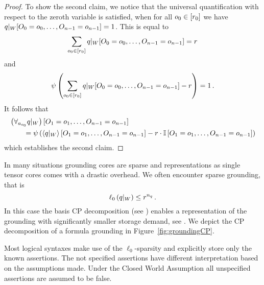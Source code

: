 \begin{proof}
	To show the second claim, we notice that the universal quantification with respect to the zeroth variable is satisfied, when for all $o_{0}\in[r_{0}]$ we have ${q}|_{W}[O_{0}=o_{0},\ldots,O_{n-1}=o_{n-1}]=1$.
	This is equal to 
	\begin{align*}
		 \sum_{o_{0}\in[r_{0}]} {q}|_{W}[O_{0}=o_{0},\ldots,O_{n-1}=o_{n-1}]  = r
	\end{align*}
	and 
	\begin{align*}
		\psi\left(\sum_{o_{0}\in[r_{0}]} {q}|_{W}[O_{0}=o_{0},\ldots,O_{n-1}=o_{n-1}] - r\right) = 1 \, . 
	\end{align*} 
	It follows that
	\begin{align*}
		& \left({\forall_{a_{o_{0}}} q}|_{W}\right)[O_{1}=o_{1},\ldots,O_{n-1}=o_{n-1}] \\
			& \quad \quad =  \psi\left(
			\left\langle {q}|_{W}\right\rangle \left[ O_{1}=o_{1},\ldots,O_{n-1}=o_{n-1} \right]
			- r \cdot \mathbb{I}\left[O_{1}=o_{1},\ldots,O_{n-1}=o_{n-1}\right]
			\right)
	\end{align*}
	which establishes the second claim.
\end{proof}




\label{sec:basisCPgrounding}

In many situations grounding cores are sparse and representations as single tensor cores comes with a drastic overhead.
We often encounter sparse grounding, that is
	\[ \ell_0\left({q}|_{W}\right) \leq r^{n_q} \, . \]
In this case the basis CP decomposition (see ) enables a representation of the grounding with significantly smaller storage demand, see .
We depict the CP decomposition of a formula grounding in Figure~\ref{fig:groundingCP}.


Most logical syntaxes make use of the $\ell_0$-sparsity and explicitly store only the known assertions.
The not specified assertions have different interpretation based on the assumptions made.
Under the Closed World Assumption all unspecified assertions are assumed to be false.

